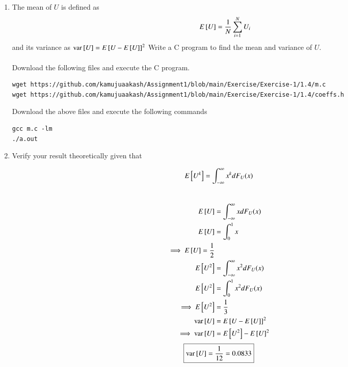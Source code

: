 \documentclass[journal,12pt,twocolumn]{IEEEtran}
\renewcommand\thesection{\arabic{section}}
\begin{document}
\begin{enumerate}[label=\thesection.\arabic*
,ref=\thesection.\theenumi]
\begin{align*}
{\implies F_U(x)=
\begin{cases}
 0 &x\le0\\
 x &0< x< 1\\
 1 &x\ge 1
\end{cases}}
\end{align*}
\item
The mean of $U$ is defined as
%
\begin{equation}
E{}\left[U\right] = \frac{1}{N}\sum_{i=1}^{N}U_i
\end{equation}
%
and its variance as
%
$
\text{var}{}\left[U\right] = E{}\left[U- E{}\left[U\right]\right]^2 
$
Write a C program to  find the mean and variance of $U$. \\
\solution \\Download the following files and execute the  C program.\\
\begin{lstlisting}
wget https://github.com/kamujuaakash/Assignment1/blob/main/Exercise/Exercise-1/1.4/m.c
wget https://github.com/kamujuaakash/Assignment1/blob/main/Exercise/Exercise-1/1.4/coeffs.h
\end{lstlisting}
Download the above files and execute the following commands
\begin{lstlisting}
gcc m.c -lm
./a.out
\end{lstlisting}
\item Verify your result theoretically given that
\end{enumerate}
%
$$
E{}\left[U^k\right] = \int_{-\infty}^{\infty}x^kdF_{U}(x)
$$
\solution \\
\begin{align*}
    E{}\left[U\right]&=\int_{-\infty}^{\infty}xdF_U(x)\\
    E{}\left[U\right]&=\int_{0}^{1}x\\
    \implies E{}\left[U\right]=\frac{1}{2}\\
    E{}\left[U^2\right]&=\int_{-\infty}^{\infty}x^{2}dF_U(x)\\
    E{}\left[U^2\right]&=\int_{0}^{1}x^{2}dF_U(x)\\
    \implies E{}\left[U^2\right]&=\frac{1}{3}\\
    \text{var}{}\left[U\right] &= E{}\left[U- E{}\left[U\right]\right]^2\\ 
    \implies \text{var}{}\left[U\right] &= E{}\left[U^2\right]- E{}\left[U\right]^2 
\end{align*}
$$ \boxed{\text{var}{}\left[U\right]=\frac{1}{12}=0.0833}$$
\end{document}
